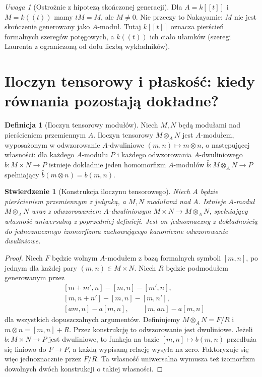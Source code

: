 \documentclass[11pt,a4paper,openany]{report}
\numberwithin{equation}{section}
\theoremstyle{plain}
\newtheorem{stwierdzenie}[twierdzenie]{Stwierdzenie}
\theoremstyle{definition}
\newtheorem{definicja}[twierdzenie]{Definicja}
\theoremstyle{remark}
\newtheorem{uwaga}[twierdzenie]{Uwaga}
\begin{document}
\begin{uwaga}[Ostrożnie z hipotezą skończonej generacji]
Dla $A=k[[t]]$ i $M=k((t))$ mamy $tM=M$,
ale $M\ne0$. Nie przeczy to Nakayamie: $M$
nie jest skończenie generowany jako $A$-moduł.
Tutaj $k[[t]]$ oznacza pierścień formalnych
szeregów potęgowych, a $k((t))$ ich ciało ułamków
(szeregi Laurenta z ograniczoną od dołu liczbą wykładników).
\end{uwaga}

\section{Iloczyn tensorowy i płaskość: kiedy równania pozostają dokładne?}
\label{sec:flatness}

\begin{definicja}[Iloczyn tensorowy modułów]
Niech $M,N$ będą modułami nad pierścieniem przemiennym $A$.
Iloczyn tensorowy $M\otimes_A N$ jest $A$-modułem,
wyposażonym w odwzorowanie $A$-dwuliniowe
$(m,n)\mapsto m\otimes n$, o następującej własności:
dla każdego $A$-modułu $P$ i każdego odwzorowania
$A$-dwuliniowego $b:M\times N\to P$ istnieje dokładnie
jeden homomorfizm $A$-modułów
$\widehat b:M\otimes_A N\to P$ spełniający
$\widehat b(m\otimes n)=b(m,n)$.
\end{definicja}

\begin{stwierdzenie}[Konstrukcja iloczynu tensorowego]
Niech $A$ będzie pierścieniem przemiennym z jedynką, a $M,N$
modułami nad $A$. Istnieje $A$-moduł $M\otimes_A N$
wraz z odwzorowaniem $A$-dwuliniowym
$M\times N\to M\otimes_A N$, spełniający własność
uniwersalną z poprzedniej definicji. Jest on jednoznaczny
z dokładnością do jednoznacznego izomorfizmu zachowującego
kanoniczne odwzorowanie dwuliniowe.
\end{stwierdzenie}
\begin{proof}
Niech $F$ będzie wolnym $A$-modułem z bazą
formalnych symboli $[m,n]$, po jednym dla każdej
pary $(m,n)\in M\times N$. Niech $R$ będzie
podmodułem generowanym przez
\[
\begin{aligned}
 &[m+m',n]-[m,n]-[m',n],\\
 &[m,n+n']-[m,n]-[m,n'],\\
 &[am,n]-a[m,n],\qquad [m,an]-a[m,n]
\end{aligned}
\]
dla wszystkich dopuszczalnych argumentów.
Definiujemy $M\otimes_A N=F/R$ i
$m\otimes n=[m,n]+R$. Przez konstrukcję
to odwzorowanie jest dwuliniowe.
Jeżeli $b:M\times N\to P$ jest dwuliniowe,
to funkcja na bazie $[m,n]\mapsto b(m,n)$
przedłuża się liniowo do $F\to P$, a każdą
wypisaną relację wysyła na zero.
Faktoryzuje się więc jednoznacznie przez $F/R$.
Ta własność uniwersalna wymusza też izomorfizm
dowolnych dwóch konstrukcji o takiej własności.
\end{proof}
\end{document}
